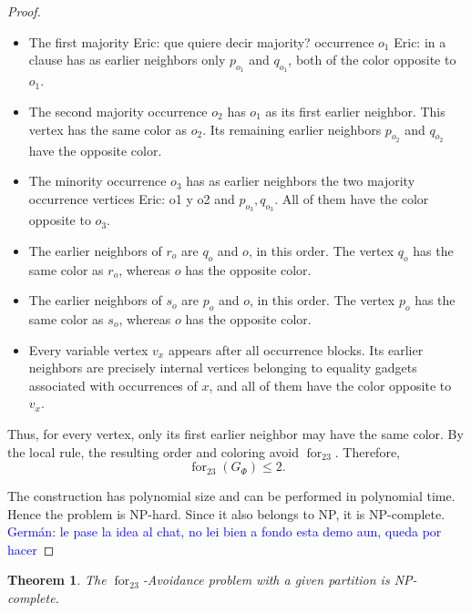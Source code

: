 \documentclass[12pt]{article}
\theoremstyle{plain}
\newtheorem{theorem}{Theorem}[section]
\theoremstyle{definition}
\theoremstyle{remark}
\theoremstyle{definition}
\newcommand{\forlabel}{\mathrm{for}}
\DeclareRobustCommand{\forparam}[1]{%
  \ensuremath{\mathop{\forlabel}\nolimits_{#1}}%
}
\newcommand{\eric}[1]{%
  \textcolor{green!50!black}{Eric: #1}%
}
\newcommand{\german}[1]{%
  \textcolor{blue}{Germán: #1}%
}
\newcommand{\forst}{\forparam{23}}
\begin{document}
\begin{proof}
\begin{itemize}
\item The first majority\eric{que quiere decir majority?} occurrence \(o_1\)\eric{in a clause} has as earlier neighbors only \(p_{o_1}\) and \(q_{o_1}\), both of
the color opposite to \(o_1\).

\item The second majority occurrence \(o_2\) has \(o_1\) as its first earlier neighbor. This vertex has the same
color as \(o_2\). Its remaining earlier neighbors \(p_{o_2}\) and \(q_{o_2}\) have the opposite color.

\item The minority occurrence \(o_3\) has as earlier neighbors the two majority occurrence vertices\eric{o1 y o2} and
\(p_{o_3},q_{o_3}\). All of them have the color opposite to \(o_3\).

\item The earlier neighbors of \(r_o\) are \(q_o\) and \(o\), in this order. The vertex \(q_o\) has the same
color as \(r_o\), whereas \(o\) has the opposite color.

\item The earlier neighbors of \(s_o\) are \(p_o\) and \(o\), in this order. The vertex \(p_o\) has the same
color as \(s_o\), whereas \(o\) has the opposite color.

\item Every variable vertex \(v_x\) appears after all occurrence blocks. Its earlier neighbors are precisely
internal vertices belonging to equality gadgets associated with occurrences of \(x\), and all of them have the
color opposite to \(v_x\).
\end{itemize}

Thus, for every vertex, only its first earlier neighbor may have the same color. By the local rule, the resulting
order and coloring avoid \(\operatorname{for}_{23}\). Therefore,
\[
\forparam{23}(G_\Phi)\le2.
\]

The construction has polynomial size and can be performed in polynomial time. Hence the problem is NP-hard.
Since it also belongs to NP, it is NP-complete.
\german{le pase la idea al chat, no lei bien a fondo esta demo aun, queda por hacer}
\end{proof}








\begin{theorem}\label{thm:forst-given-partition-np-complete}
The \(\forst\)-Avoidance problem with a given partition is NP-complete.
\end{theorem}
\end{document}
